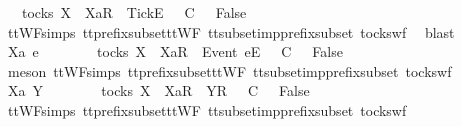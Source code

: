\begin{isabellebody}
\ {\isachardoublequoteopen}{\isasymsigma}\ {\isasymin}\ tocks\ X\ {\isasymLongrightarrow}\ {\isacharbrackleft}Xa{\isacharbrackright}\isactrlsub R\ {\isacharhash}\ {\isacharbrackleft}Tick{\isacharbrackright}\isactrlsub E\ {\isacharhash}\ {\isasymrho}\ {\isasymsubseteq}\isactrlsub C\ {\isasymsigma}\ {\isasymLongrightarrow}\ False{\isachardoublequoteclose}\isanewline
\ \ \ \ \isamarkupfalse%
\ ttWF{\isachardot}simps{\isacharparenleft}{}{}{\isacharparenright}\ tt{\isacharunderscore}prefix{\isacharunderscore}subset{\isacharunderscore}ttWF\ tt{\isacharunderscore}subset{\isacharunderscore}imp{\isacharunderscore}prefix{\isacharunderscore}subset\ tocks{\isacharunderscore}wf\ \isamarkupfalse%
\ blast\isanewline
{}\isamarkupfalse%
\isanewline
\ \ \isamarkupfalse%
\ Xa\ e\ {\isasymrho}\ {\isasymsigma}\isanewline
\ \ \isamarkupfalse%
\ {\isachardoublequoteopen}{\isasymsigma}\ {\isasymin}\ tocks\ X\ {\isasymLongrightarrow}\ {\isacharbrackleft}Xa{\isacharbrackright}\isactrlsub R\ {\isacharhash}\ {\isacharbrackleft}Event\ e{\isacharbrackright}\isactrlsub E\ {\isacharhash}\ {\isasymrho}\ {\isasymsubseteq}\isactrlsub C\ {\isasymsigma}\ {\isasymLongrightarrow}\ False{\isachardoublequoteclose}\isanewline
\ \ \ \ \isamarkupfalse%
\ {\isacharparenleft}meson\ ttWF{\isachardot}simps{\isacharparenleft}{}{}{\isacharparenright}\ tt{\isacharunderscore}prefix{\isacharunderscore}subset{\isacharunderscore}ttWF\ tt{\isacharunderscore}subset{\isacharunderscore}imp{\isacharunderscore}prefix{\isacharunderscore}subset\ tocks{\isacharunderscore}wf{\isacharparenright}\isanewline
{}\isamarkupfalse%
\isanewline
\ \ \isamarkupfalse%
\ Xa\ Y\ {\isasymrho}\ {\isasymsigma}\isanewline
\ \ \isamarkupfalse%
\ {\isachardoublequoteopen}{\isasymsigma}\ {\isasymin}\ tocks\ X\ {\isasymLongrightarrow}\ {\isacharbrackleft}Xa{\isacharbrackright}\isactrlsub R\ {\isacharhash}\ {\isacharbrackleft}Y{\isacharbrackright}\isactrlsub R\ {\isacharhash}\ {\isasymrho}\ {\isasymsubseteq}\isactrlsub C\ {\isasymsigma}\ {\isasymLongrightarrow}\ False{\isachardoublequoteclose}\isanewline
\ \ \ \ \isamarkupfalse%
\ ttWF{\isachardot}simps{\isacharparenleft}{}{}{\isacharparenright}\ tt{\isacharunderscore}prefix{\isacharunderscore}subset{\isacharunderscore}ttWF\ tt{\isacharunderscore}subset{\isacharunderscore}imp{\isacharunderscore}prefix{\isacharunderscore}subset\ tocks{\isacharunderscore}wf\ \isamarkupfalse%

\end{isabellebody}
